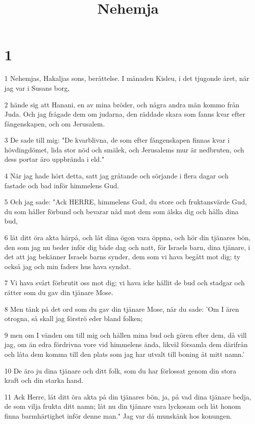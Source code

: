 

\title{Nehemja}


\chapter{1}

\par 1 Nehemjas, Hakaljas sons, berättelse. I månaden Kisleu, i det tjugonde året, när jag var i Susans borg,
\par 2 hände sig att Hanani, en av mina bröder, och några andra män kommo från Juda. Och jag frågade dem om judarna, den räddade skara som fanns kvar efter fångenskapen, och om Jerusalem.
\par 3 De sade till mig: "De kvarblivna, de som efter fångenskapen finnas kvar i hövdingdömet, lida stor nöd och smälek, och Jerusalems mur är nedbruten, och dess portar äro uppbrända i eld."
\par 4 När jag hade hört detta, satt jag gråtande och sörjande i flera dagar och fastade och bad inför himmelens Gud.
\par 5 Och jag sade: "Ack HERRE, himmelens Gud, du store och fruktansvärde Gud, du som håller förbund och bevarar nåd mot dem som älska dig och hålla dina bud,
\par 6 låt ditt öra akta härpå, och låt dina ögon vara öppna, och hör din tjänares bön, den som jag nu beder inför dig både dag och natt, för Israels barn, dina tjänare, i det att jag bekänner Israels barns synder, dem som vi hava begått mot dig; ty också jag och min faders hus hava syndat.
\par 7 Vi hava svårt förbrutit oss mot dig; vi hava icke hållit de bud och stadgar och rätter som du gav din tjänare Mose.
\par 8 Men tänk på det ord som du gav din tjänare Mose, när du sade: 'Om I ären otrogna, så skall jag förströ eder bland folken;
\par 9 men om I vänden om till mig och hållen mina bud och gören efter dem, då vill jag, om än edra fördrivna vore vid himmelens ända, likväl församla dem därifrån och låta dem komma till den plats som jag har utvalt till boning åt mitt namn.'
\par 10 De äro ju dina tjänare och ditt folk, som du har förlossat genom din stora kraft och din starka hand.
\par 11 Ack Herre, låt ditt öra akta på din tjänares bön, ja, på vad dina tjänare bedja, de som vilja frukta ditt namn; låt nu din tjänare vara lyckosam och låt honom finna barmhärtighet inför denne man." Jag var då munskänk hos konungen.

